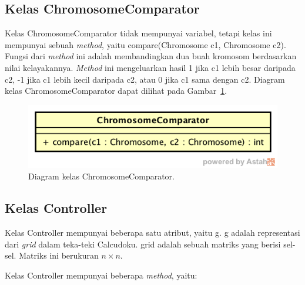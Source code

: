 \subsection{Kelas ChromosomeComparator}
\label{sec:kelaschromosomecomparator}

Kelas ChromosomeComparator tidak mempunyai variabel, tetapi kelas ini mempunyai sebuah \textit{method}, yaitu compare(Chromosome c1, Chromosome c2). Fungsi dari \textit{method} ini adalah membandingkan dua buah kromosom berdasarkan nilai kelayakannya. \textit{Method} ini mengeluarkan hasil 1 jika c1 lebih besar daripada c2, -1 jika c1 lebih kecil daripada c2, atau 0 jika c1 sama dengan c2. Diagram kelas ChromosomeComparator dapat dilihat pada Gambar~\ref{fig:diagramkelaschromosomecomparator}.

\begin{figure}
\centering
\captionsetup{justification=centering}
\includegraphics[scale=0.5]{Gambar/Perancangan/DiagramKelasChromosomeComparator.png}
\caption[Diagram kelas ChromosomeComparator.]{Diagram kelas ChromosomeComparator.}
\label{fig:diagramkelaschromosomecomparator}
\end{figure}

\subsection{Kelas Controller}
\label{sec:kelascontroller}

Kelas Controller mempunyai beberapa satu atribut, yaitu g. g adalah representasi dari \textit{grid} dalam teka-teki Calcudoku. grid adalah sebuah matriks yang berisi sel-sel. Matriks ini berukuran \begin{math} n \times n\end{math}.

Kelas Controller mempunyai beberapa \textit{method}, yaitu:


